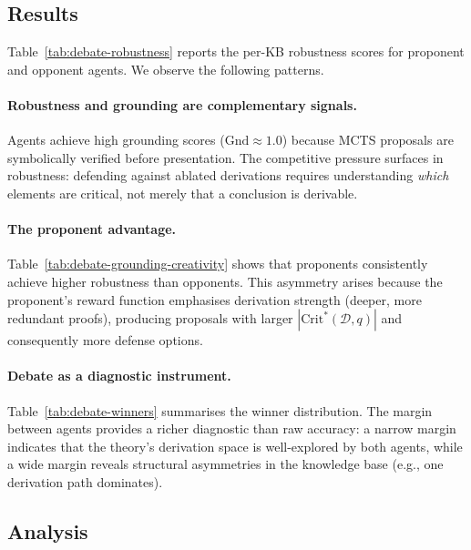 \documentclass{article}
\theoremstyle{definition}
\newcommand{\D}{\mathcal{D}}
\newcommand{\CritStar}{\mathrm{Crit}^{*}}
\newcommand{\Gnd}{\mathrm{Gnd}}
\begin{document}
\subsection{Results}\label{subsec:debate-results}



Table~\ref{tab:debate-robustness} reports the per-KB robustness scores for proponent and opponent agents. We observe the following patterns.

\paragraph{Robustness and grounding are complementary signals.} Agents achieve high grounding scores ($\Gnd \approx 1.0$) because MCTS proposals are symbolically verified before presentation. The competitive pressure surfaces in robustness: defending against ablated derivations requires understanding \emph{which} elements are critical, not merely that a conclusion is derivable.



\paragraph{The proponent advantage.} Table~\ref{tab:debate-grounding-creativity} shows that proponents consistently achieve higher robustness than opponents. This asymmetry arises because the proponent's reward function emphasises derivation strength (deeper, more redundant proofs), producing proposals with larger $|\CritStar(\D, q)|$ and consequently more defense options.



\paragraph{Debate as a diagnostic instrument.} Table~\ref{tab:debate-winners} summarises the winner distribution. The margin between agents provides a richer diagnostic than raw accuracy: a narrow margin indicates that the theory's derivation space is well-explored by both agents, while a wide margin reveals structural asymmetries in the knowledge base (e.g., one derivation path dominates).

\subsection{Analysis}\label{subsec:debate-analysis}
\end{document}
